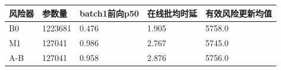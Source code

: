 \begin{tabular}{lllll}
\toprule
风险器 & 参数量 & batch1前向p50 & 在线批均时延 & 有效风险更新均值 \\
\midrule
B0 & 1223681 & 0.476 & 1.905 & 5758.0 \\
M1 & 127041 & 0.986 & 2.767 & 5745.0 \\
A-B & 127041 & 0.958 & 2.876 & 5756.0 \\
\bottomrule
\end{tabular}